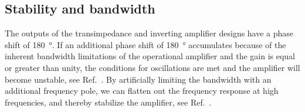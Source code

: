 \subsection{Stability and bandwidth}

The outputs of the transimpedance and inverting amplifier designs have a phase shift of \SI{180}{\degree}.
If an additional phase shift of \SI{180}{\degree} accumulates because of the inherent bandwidth limitations of the operational amplifier and the gain is equal or greater than unity, the conditions for oscillations are met and the amplifier will become unstable, see Ref.~\cite[p.~395]{Terrel96}.
By artificially limiting the bandwidth with an additional frequency pole, we can flatten out the frequency response at high frequencies, and thereby stabilize the amplifier, see Ref.~\cite[p.~184]{Kay12}.

